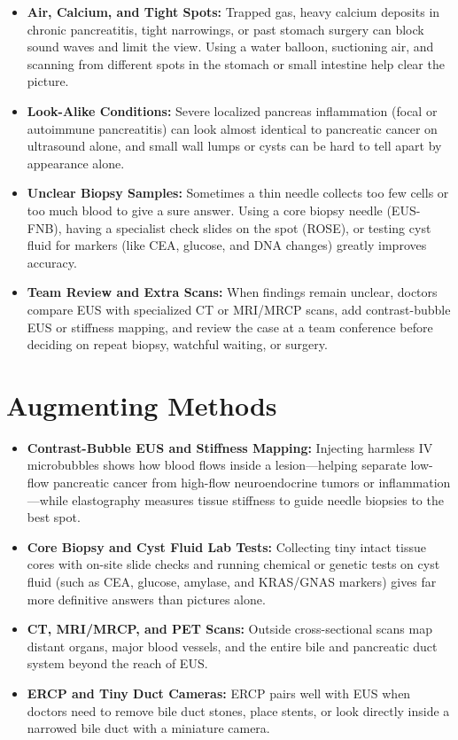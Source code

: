 \begin{itemize}
    \item \textbf{Air, Calcium, and Tight Spots:} Trapped gas, heavy calcium deposits in chronic pancreatitis, tight narrowings, or past stomach surgery can block sound waves and limit the view. Using a water balloon, suctioning air, and scanning from different spots in the stomach or small intestine help clear the picture.
    \item \textbf{Look-Alike Conditions:} Severe localized pancreas inflammation (focal or autoimmune pancreatitis) can look almost identical to pancreatic cancer on ultrasound alone, and small wall lumps or cysts can be hard to tell apart by appearance alone.
    \item \textbf{Unclear Biopsy Samples:} Sometimes a thin needle collects too few cells or too much blood to give a sure answer. Using a core biopsy needle (EUS-FNB), having a specialist check slides on the spot (ROSE), or testing cyst fluid for markers (like CEA, glucose, and DNA changes) greatly improves accuracy.
    \item \textbf{Team Review and Extra Scans:} When findings remain unclear, doctors compare EUS with specialized CT or MRI/MRCP scans, add contrast-bubble EUS or stiffness mapping, and review the case at a team conference before deciding on repeat biopsy, watchful waiting, or surgery.
\end{itemize}

\section{Augmenting Methods}

\begin{itemize}
    \item \textbf{Contrast-Bubble EUS and Stiffness Mapping:} Injecting harmless IV microbubbles shows how blood flows inside a lesion---helping separate low-flow pancreatic cancer from high-flow neuroendocrine tumors or inflammation---while elastography measures tissue stiffness to guide needle biopsies to the best spot.
    \item \textbf{Core Biopsy and Cyst Fluid Lab Tests:} Collecting tiny intact tissue cores with on-site slide checks and running chemical or genetic tests on cyst fluid (such as CEA, glucose, amylase, and KRAS/GNAS markers) gives far more definitive answers than pictures alone.
    \item \textbf{CT, MRI/MRCP, and PET Scans:} Outside cross-sectional scans map distant organs, major blood vessels, and the entire bile and pancreatic duct system beyond the reach of EUS.
    \item \textbf{ERCP and Tiny Duct Cameras:} ERCP pairs well with EUS when doctors need to remove bile duct stones, place stents, or look directly inside a narrowed bile duct with a miniature camera.
\end{itemize}

